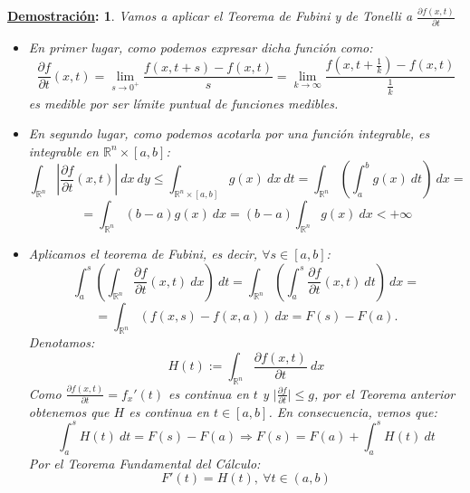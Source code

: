\documentclass[10pt,a4paper,openright]{book}
\theoremstyle{break}
\newtheorem*{demo}{\underline{Demostración}:}
\newcommand{\dif}[1]{\ d#1}
\begin{document}
\begin{demo}
Vamos a aplicar el Teorema de Fubini y de Tonelli a $\frac{\partial f\left(x, t\right)}{\partial t} $
\begin{itemize}
    \item En primer lugar, como podemos expresar dicha función como: 
    $$\frac{\partial f}{\partial t} \left(x, t\right) = \lim_{s \rightarrow 0^+} \frac{f \left(x, t + s\right) - f \left(x, t\right)}{s} = \lim_{k \rightarrow \infty} \frac{f \left(x, t + \frac{1}{k}\right) - f \left(x, t\right)}{\frac{1}{k}}$$
    es medible por ser límite puntual de funciones medibles.
    \item En segundo lugar, como podemos acotarla por una función integrable, es integrable en $\mathbb{R}^n \times \left[a, b\right]$:
    $$\int_{\mathbb{R}^n} \left\vert \frac{\partial f}{\partial t} \left(x, t\right)\right\vert  \dif{x} \dif{y} \le \int_{\mathbb{R}^n \times \left[a, b\right]} g \left(x\right) \dif{x} \dif{t} = \int_{\mathbb{R}^n} \left(\int_a^b g \left(x\right) \dif{t}  \right) \dif{x}  = $$
    $$ = \int_{\mathbb{R}^n} \left(b - a\right) g \left(x\right) \dif{x} = \left(b - a\right) \int_{\mathbb{R}^n} g(x) \dif{x}< +\infty$$
    \item Aplicamos el teorema de Fubini, es decir, $\forall s \in \left[a, b\right]$: 
    $$\int_a^s \left(\int_{\mathbb{R}^n} \frac{\partial f}{\partial t} \left(x, t\right) \dif{x} \right) \dif{t} = \int_{\mathbb{R}^n} \left(\int_a^s \frac{\partial f}{\partial t} \left(x, t\right) \dif{t} \right) \dif{x} = $$
    $$= \int_{\mathbb{R}^n} \left( f \left(x, s\right) - f \left(x, a\right)\right) \dif{x} = F \left(s\right) - F \left(a\right).$$
    Denotamos: 
    $$H \left(t\right) := \int_{\mathbb{R}^n} \frac{\partial f\left(x, t\right)}{\partial t}  \dif{x}$$
    Como $\frac{\partial f\left(x, t\right)}{\partial t}  = f_x' \left(t\right)$ es continua en $t$ y $\vert \frac{\partial f}{\partial t} \vert \le g$, por el Teorema anterior obtenemos que $H$ es continua en $t \in \left[a, b\right]$. En consecuencia, vemos que: 
    $$\int_a^s H \left(t\right) \dif{t} = F \left(s\right) - F \left(a\right) \Rightarrow F \left(s\right) = F \left(a\right) + \int_a^s H \left(t\right) \dif{t}$$
	Por el Teorema Fundamental del Cálculo:    
    $$F' \left(t\right) = H \left(t\right),\ \forall t \in \left(a, b\right) $$
\end{itemize}
\end{demo}
\end{document}
